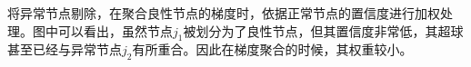 \documentclass[lettersize,journal]{IEEEtran}
\begin{document}
将异常节点剔除，在聚合良性节点的梯度时，依据正常节点的置信度进行加权处理。图中可以看出，虽然节点$j_1$被划分为了良性节点，但其置信度非常低，其超球甚至已经与异常节点$j_2$有所重合。因此在梯度聚合的时候，其权重较小。






\end{document}
